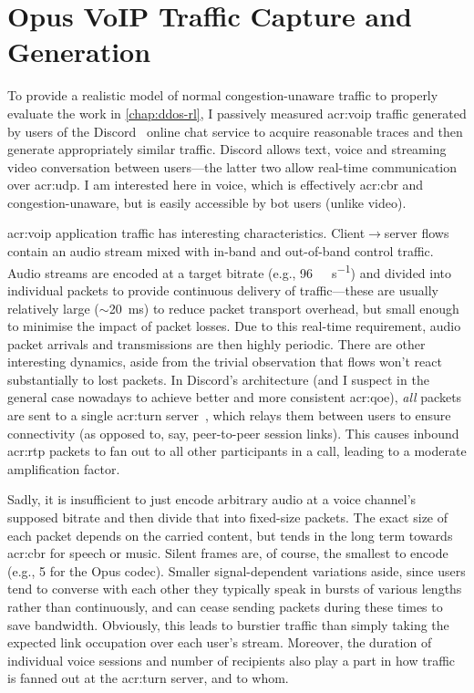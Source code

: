 \chapter{Opus VoIP Traffic Capture and Generation}\label{adx:opus-traffic}
To provide a realistic model of normal congestion-unaware traffic to properly evaluate the work in \cref{chap:ddos-rl}, I passively measured \gls{acr:voip} traffic generated by users of the Discord~\parencite{discord} online chat service to acquire reasonable traces and then generate appropriately similar traffic.
Discord allows text, voice and streaming video conversation between users---the latter two allow real-time communication over \gls{acr:udp}.
I am interested here in voice, which is effectively \gls{acr:cbr} and congestion-unaware, but is easily accessible by bot users (unlike video).

\gls{acr:voip} application traffic has interesting characteristics.
Client$\rightarrow$server flows contain an audio stream mixed with in-band and out-of-band control traffic.
Audio streams are encoded at a target bitrate (e.g., \qty{96}{\kilo\bit\per\second}) and divided into individual packets to provide continuous delivery of traffic---these are usually relatively large ($\sim$\qty{20}{\milli\second}) to reduce packet transport overhead, but small enough to minimise the impact of packet losses.
Due to this real-time requirement, audio packet arrivals and transmissions are then highly periodic.
There are other interesting dynamics, aside from the trivial observation that flows won't react substantially to lost packets.
In Discord's architecture (and I suspect in the general case nowadays to achieve better and more consistent \gls{acr:qoe}), \emph{all} packets are sent to a single \gls{acr:turn} server~\parencite{rfc8656}, which relays them between users to ensure connectivity (as opposed to, say, peer-to-peer session links).
This causes inbound \gls{acr:rtp} packets to fan out to all other participants in a call, leading to a moderate amplification factor.


Sadly, it is insufficient to just encode arbitrary audio at a voice channel's supposed bitrate and then divide that into fixed-size packets.
The exact size of each packet depends on the carried content, but tends in the long term towards \gls{acr:cbr} for speech or music.
Silent frames are, of course, the smallest to encode (e.g., \qty{5}{\byte} for the Opus codec).
Smaller signal-dependent variations aside, since users tend to converse with each other they typically speak in bursts of various lengths rather than continuously, and can cease sending packets during these times to save bandwidth.
Obviously, this leads to burstier traffic than simply taking the expected link occupation over each user's stream.
Moreover, the duration of individual voice sessions and number of recipients also play a part in how traffic is fanned out at the \gls{acr:turn} server, and to whom.


